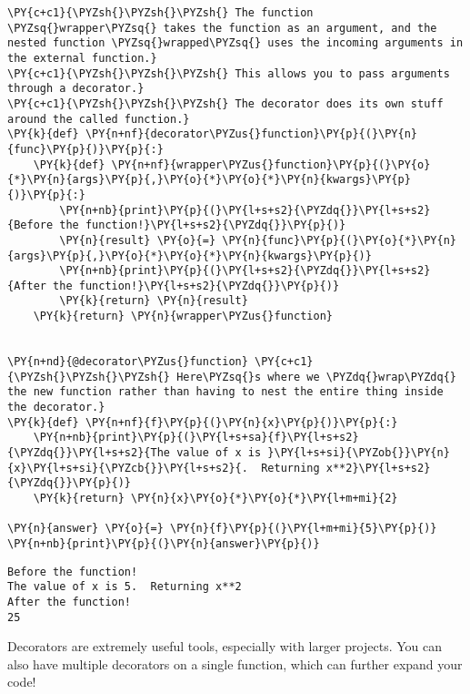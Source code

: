     \begin{tcolorbox}[breakable, size=fbox, boxrule=1pt, pad at break*=1mm,colback=cellbackground, colframe=cellborder]
\begin{Verbatim}[commandchars=\\\{\}]
\PY{c+c1}{\PYZsh{}\PYZsh{}\PYZsh{} The function \PYZsq{}wrapper\PYZsq{} takes the function as an argument, and the nested function \PYZsq{}wrapped\PYZsq{} uses the incoming arguments in the external function.}
\PY{c+c1}{\PYZsh{}\PYZsh{}\PYZsh{} This allows you to pass arguments through a decorator.}
\PY{c+c1}{\PYZsh{}\PYZsh{}\PYZsh{} The decorator does its own stuff around the called function.}
\PY{k}{def} \PY{n+nf}{decorator\PYZus{}function}\PY{p}{(}\PY{n}{func}\PY{p}{)}\PY{p}{:}
    \PY{k}{def} \PY{n+nf}{wrapper\PYZus{}function}\PY{p}{(}\PY{o}{*}\PY{n}{args}\PY{p}{,}\PY{o}{*}\PY{o}{*}\PY{n}{kwargs}\PY{p}{)}\PY{p}{:}
        \PY{n+nb}{print}\PY{p}{(}\PY{l+s+s2}{\PYZdq{}}\PY{l+s+s2}{Before the function!}\PY{l+s+s2}{\PYZdq{}}\PY{p}{)}
        \PY{n}{result} \PY{o}{=} \PY{n}{func}\PY{p}{(}\PY{o}{*}\PY{n}{args}\PY{p}{,}\PY{o}{*}\PY{o}{*}\PY{n}{kwargs}\PY{p}{)}
        \PY{n+nb}{print}\PY{p}{(}\PY{l+s+s2}{\PYZdq{}}\PY{l+s+s2}{After the function!}\PY{l+s+s2}{\PYZdq{}}\PY{p}{)}
        \PY{k}{return} \PY{n}{result}
    \PY{k}{return} \PY{n}{wrapper\PYZus{}function}


\PY{n+nd}{@decorator\PYZus{}function} \PY{c+c1}{\PYZsh{}\PYZsh{}\PYZsh{} Here\PYZsq{}s where we \PYZdq{}wrap\PYZdq{} the new function rather than having to nest the entire thing inside the decorator.}
\PY{k}{def} \PY{n+nf}{f}\PY{p}{(}\PY{n}{x}\PY{p}{)}\PY{p}{:}
    \PY{n+nb}{print}\PY{p}{(}\PY{l+s+sa}{f}\PY{l+s+s2}{\PYZdq{}}\PY{l+s+s2}{The value of x is }\PY{l+s+si}{\PYZob{}}\PY{n}{x}\PY{l+s+si}{\PYZcb{}}\PY{l+s+s2}{.  Returning x**2}\PY{l+s+s2}{\PYZdq{}}\PY{p}{)}
    \PY{k}{return} \PY{n}{x}\PY{o}{*}\PY{o}{*}\PY{l+m+mi}{2}

\PY{n}{answer} \PY{o}{=} \PY{n}{f}\PY{p}{(}\PY{l+m+mi}{5}\PY{p}{)}
\PY{n+nb}{print}\PY{p}{(}\PY{n}{answer}\PY{p}{)}
\end{Verbatim}
\end{tcolorbox}

    \begin{Verbatim}[commandchars=\\\{\}]
Before the function!
The value of x is 5.  Returning x**2
After the function!
25
    \end{Verbatim}

    Decorators are extremely useful tools, especially with larger projects.
You can also have multiple decorators on a single function, which can
further expand your code!


